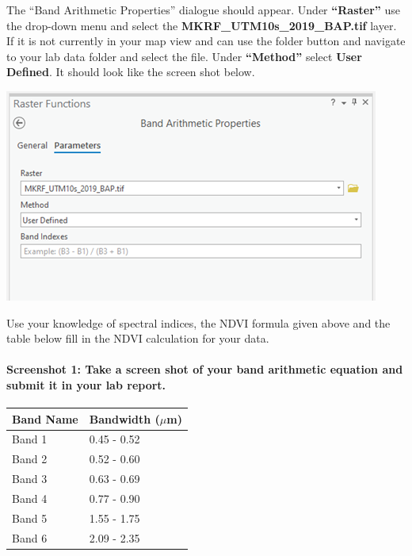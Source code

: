 \documentclass[
]{book}
\begin{document}
The ``Band Arithmetic Properties'' dialogue should appear. Under \textbf{``Raster''} use the drop-down menu and select the \textbf{MKRF\_UTM10s\_2019\_BAP.tif} layer. If it is not currently in your map view and can use the folder button and navigate to your lab data folder and select the file. Under \textbf{``Method''} select \textbf{User Defined}. It should look like the screen shot below.

\begin{center}\includegraphics[width=0.6\linewidth]{images/07-band-arithmetic-properties} \end{center}

Use your knowledge of spectral indices, the NDVI formula given above and the table below fill in the NDVI calculation for your data.

\hypertarget{screenshot-1-take-a-screen-shot-of-your-band-arithmetic-equation-and-submit-it-in-your-lab-report.}{%
\paragraph*{Screenshot 1: Take a screen shot of your band arithmetic equation and submit it in your lab report.}\label{screenshot-1-take-a-screen-shot-of-your-band-arithmetic-equation-and-submit-it-in-your-lab-report.}}

\begin{longtable}[]{@{}ll@{}}
\toprule\noalign{}
Band Name & Bandwidth (\(\mu\)m) \\
\midrule\noalign{}
\endhead
\bottomrule\noalign{}
\endlastfoot
Band 1 & 0.45 - 0.52 \\
Band 2 & 0.52 - 0.60 \\
Band 3 & 0.63 - 0.69 \\
Band 4 & 0.77 - 0.90 \\
Band 5 & 1.55 - 1.75 \\
Band 6 & 2.09 - 2.35 \\
\end{longtable}
\end{document}
